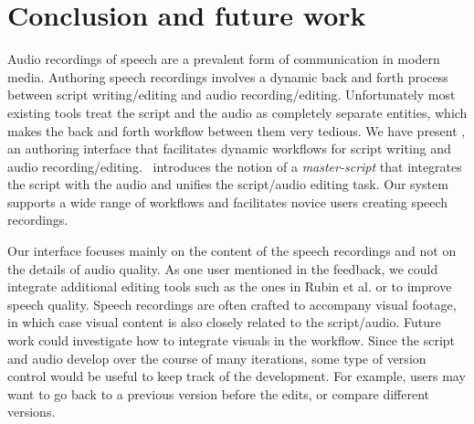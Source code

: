 \section{Conclusion and future work}
Audio recordings of speech are a prevalent form of communication
in modern media. Authoring speech
recordings involves a dynamic back and forth process between
script writing/editing and audio recording/editing. Unfortunately most existing tools treat the script and the audio as completely separate entities, which makes the back and forth workflow between them very tedious. We have present \systemname,
an authoring interface that facilitates dynamic workflows for
script writing and  audio recording/editing. \systemname\ introduces the notion of a \emph{master-script} that integrates the script with the audio and unifies the script/audio editing task. Our system supports a wide range of workflows and facilitates novice users creating speech recordings. 

Our interface focuses mainly on the content of the speech recordings and not on the details of audio quality. As one user mentioned in the feedback, we could integrate additional editing tools such as the ones in Rubin et al. \cite{rubin2013content} or \cite{rubin2015capture} to improve speech quality. 
Speech recordings are often crafted to accompany visual footage, in which case visual content is also closely related to the script/audio.
Future work could investigate how to integrate visuals in the workflow.
Since the script and audio develop over the course of many iterations, some type of version control would be useful to keep track of the development. For example, users may want to go back to a previous version before the edits, or compare different versions. 


